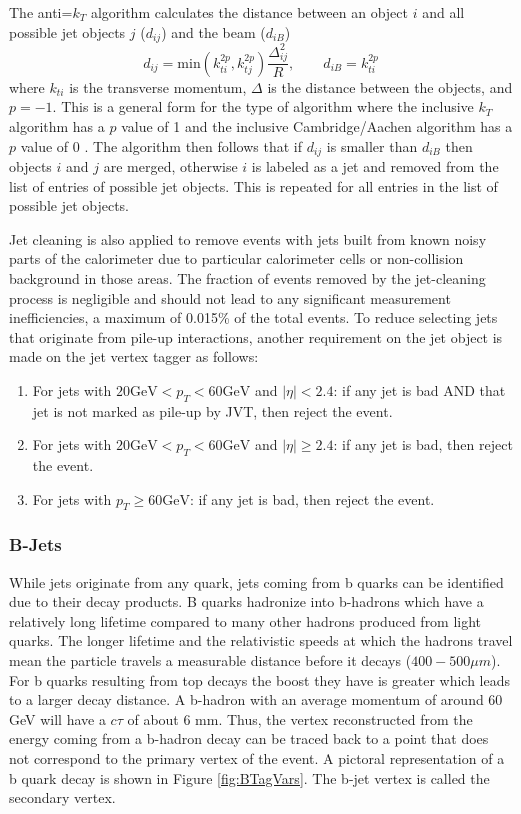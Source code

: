 The anti=$k_T$ algorithm calculates the distance between an object $i$ and all possible jet objects $j$ ($d_{ij}$) and the beam ($d_{iB}$)
\[ d_{ij} = \text{min}(k_{ti}^{2p},k_{tj}^{2p})\frac{\Delta^2_{ij}}{R},\qquad 
d_{iB} = k_{ti}^{2p} \] 
where $k_{ti}$ is the transverse momentum, $\Delta$ is the distance between the objects, and $p=-1$.  This is a general form for the type of algorithm where the inclusive $k_T$ algorithm has a $p$ value of 1 and the inclusive Cambridge/Aachen algorithm has a $p$ value of 0 \cite{CambridgeAachen}.  The algorithm then follows that if $d_{ij}$ is smaller than $d_{iB}$ then objects $i$ and $j$ are merged, otherwise $i$ is labeled as a jet and removed from the list of entries of possible jet objects.  This is repeated for all entries in the list of possible jet objects.

Jet cleaning is also applied to remove events with jets built from known noisy parts of the calorimeter due to particular calorimeter cells or non-collision background in those areas\cite{JetCleaning}.  The fraction of events removed by the jet-cleaning process is negligible and should not lead to any significant measurement inefficiencies, a maximum of 0.015\% of the total events.  To reduce selecting jets that originate from pile-up interactions, another requirement on the jet object is made on the jet vertex tagger\cite{JetJVT, JetCleanTwiki} as follows:
\begin{enumerate}
\item For jets with $20 \mathrm{ GeV } < p_{T} < 60 \mathrm{ GeV }$ and $|\eta| < 2.4$: if any jet is bad AND that jet is not marked as pile-up by JVT, then reject the event.
\item For jets with $20 \mathrm{ GeV } < p_{T} < 60 \mathrm{ GeV }$ and $|\eta| \geq 2.4$: if any jet is bad, then reject the event.
\item For jets with $p_{T} \geq 60 \mathrm{ GeV }$: if any jet is bad, then reject the event.
\end{enumerate}


\subsubsection{B-Jets}

While jets originate from any quark, jets coming from b quarks can be identified due to their decay products.  B quarks hadronize into b-hadrons which have a relatively long lifetime compared to many other hadrons produced from light quarks.  The longer lifetime and the relativistic speeds at which the hadrons travel mean the particle travels a measurable distance before it decays ($400-500 \mu m$)\cite{CMSct}.  For b quarks resulting from top decays the boost they have is greater which leads to a larger decay distance.  A b-hadron with an average momentum of around 60 GeV will have a $c\tau$ of about 6 mm.  Thus, the vertex reconstructed from the energy coming from a b-hadron decay can be traced back to a point that does not correspond to the primary vertex of the event.    A pictoral representation of a b quark decay is shown in Figure \ref{fig:BTagVars}.  The b-jet vertex is called the secondary vertex.  

